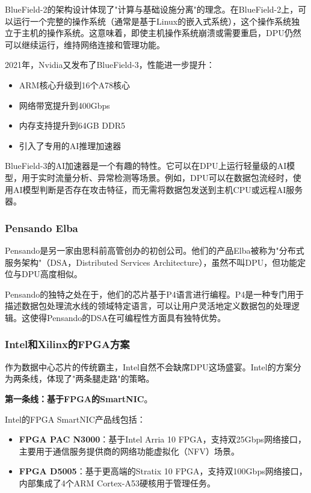 BlueField-2的架构设计体现了"计算与基础设施分离"的理念。在BlueField-2上，可以运行一个完整的操作系统（通常是基于Linux的嵌入式系统），这个操作系统独立于主机的操作系统。这意味着，即使主机操作系统崩溃或需要重启，DPU仍然可以继续运行，维持网络连接和管理功能。

2021年，Nvidia又发布了BlueField-3，性能进一步提升：

\begin{itemize}
    \item ARM核心升级到16个A78核心
    \item 网络带宽提升到400Gbps
    \item 内存支持提升到64GB DDR5
    \item 引入了专用的AI推理加速器
\end{itemize}

BlueField-3的AI加速器是一个有趣的特性。它可以在DPU上运行轻量级的AI模型，用于实时流量分析、异常检测等场景。例如，DPU可以在数据包流经时，使用AI模型判断是否存在攻击特征，而无需将数据包发送到主机CPU或远程AI服务器。

\subsubsection{Pensando Elba}

Pensando是另一家由思科前高管创办的初创公司。他们的产品Elba被称为"分布式服务架构"（DSA，Distributed Services Architecture），虽然不叫DPU，但功能定位与DPU高度相似。

Pensando的独特之处在于，他们的芯片基于P4语言进行编程。P4是一种专门用于描述数据包处理流水线的领域特定语言，可以让用户灵活地定义数据包的处理逻辑。这使得Pensando的DSA在可编程性方面具有独特优势。

\subsubsection{Intel和Xilinx的FPGA方案}

作为数据中心芯片的传统霸主，Intel自然不会缺席DPU这场盛宴。Intel的方案分为两条线，体现了"两条腿走路"的策略。

\textbf{第一条线：基于FPGA的SmartNIC}。

Intel的FPGA SmartNIC产品线包括：

\begin{itemize}
    \item \textbf{FPGA PAC N3000}：基于Intel Arria 10 FPGA，支持双25Gbps网络接口，主要用于通信服务提供商的网络功能虚拟化（NFV）场景。
    \item \textbf{FPGA D5005}：基于更高端的Stratix 10 FPGA，支持双100Gbps网络接口，内部集成了4个ARM Cortex-A53硬核用于管理任务。
\end{itemize}

